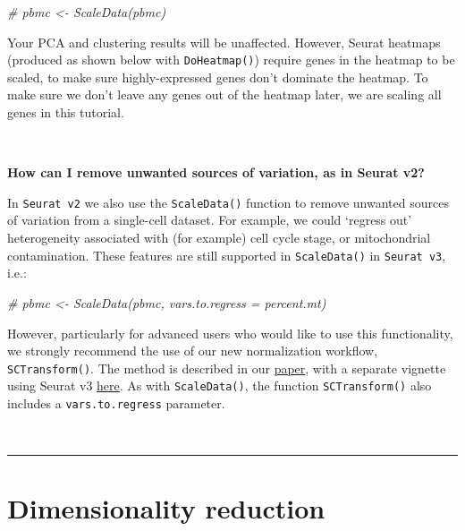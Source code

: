 \documentclass[
]{book}
\newenvironment{Shaded}{\begin{snugshade}}{\end{snugshade}}
\newcommand{\CommentTok}[1]{\textcolor[rgb]{0.56,0.35,0.01}{\textit{#1}}}
\begin{document}
\begin{Shaded}
\begin{Highlighting}[]
\CommentTok{\# pbmc \textless{}{-} ScaleData(pbmc)}
\end{Highlighting}
\end{Shaded}

Your PCA and clustering results will be unaffected. However, Seurat heatmaps (produced as shown below with \texttt{DoHeatmap()}) require genes in the heatmap to be scaled, to make sure highly-expressed genes don't dominate the heatmap. To make sure we don't leave any genes out of the heatmap later, we are scaling all genes in this tutorial.

~

\textbf{How can I remove unwanted sources of variation, as in Seurat v2?}

In \texttt{Seurat\ v2} we also use the \texttt{ScaleData()} function to remove unwanted sources of variation from a single-cell dataset. For example, we could `regress out' heterogeneity associated with (for example) cell cycle stage, or mitochondrial contamination. These features are still supported in \texttt{ScaleData()} in \texttt{Seurat\ v3}, i.e.:

\begin{Shaded}
\begin{Highlighting}[]
\CommentTok{\# pbmc \textless{}{-} ScaleData(pbmc, vars.to.regress = \textquotesingle{}percent.mt\textquotesingle{})}
\end{Highlighting}
\end{Shaded}

However, particularly for advanced users who would like to use this functionality, we strongly recommend the use of our new normalization workflow, \texttt{SCTransform()}. The method is described in our \href{https://genomebiology.biomedcentral.com/articles/10.1186/s13059-019-1874-1}{paper}, with a separate vignette using Seurat v3 \href{sctransform_vignette.html}{here}. As with \texttt{ScaleData()}, the function \texttt{SCTransform()} also includes a \texttt{vars.to.regress} parameter.

~

\begin{center}\rule{0.5\linewidth}{0.5pt}\end{center}

\chapter{Dimensionality reduction}\label{dimensionality-reduction}
\end{document}
